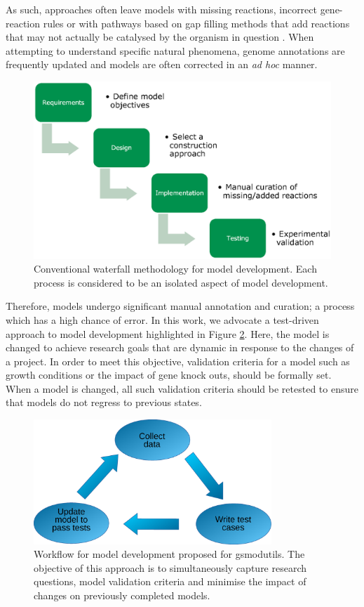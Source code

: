 \documentclass[journal=asbcd6,10pt]{achemso}
\begin{document}
As such, approaches often leave models with missing reactions, incorrect gene-reaction rules \cite{thiele2010protocol} or with pathways based on gap filling methods that add reactions that may not actually be catalysed by the organism in question \cite{benedict2014likelihood}.
When attempting to understand specific natural phenomena, genome annotations are frequently updated and models are often corrected in an \textit{ad hoc} manner.

\begin{figure}[ht]
\includegraphics[width=\textwidth]{waterfall.eps}
\caption{Conventional waterfall methodology for model development.
Each process is considered to be an isolated aspect of model development.}
\label{fig:methodology_approaches}
\end{figure}

Therefore, models undergo significant manual annotation and curation; a process which has a high chance of error.
In this work, we advocate a test-driven approach to model development highlighted in Figure \ref{fig:test_driven}.
Here, the model is changed to achieve research goals that are dynamic in response to the changes of a project.
In order to meet this objective, validation criteria for a model such as growth conditions or the impact of gene knock outs, should be formally set.
When a model is changed, all such validation criteria should be retested to ensure that models do not regress to previous states.

\begin{figure}[ht]
\centering
\includegraphics[width=0.8\textwidth]{testdriven.eps}
\caption{Workflow for model development proposed for gsmodutils.
The objective of this approach is to simultaneously capture research questions, model validation criteria and minimise the impact of changes on previously completed models.
}
\label{fig:test_driven}
\end{figure}
\end{document}
